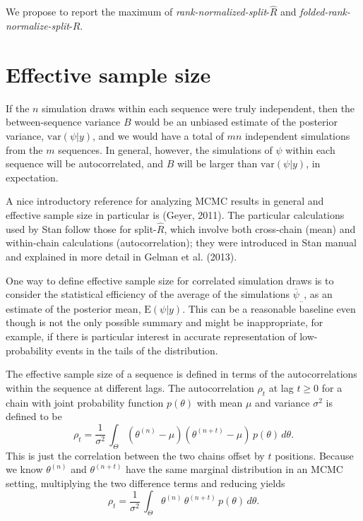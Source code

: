 \documentclass[11pt]{article}
\begin{document}
We propose to report the maximum of {\em
  rank-normalized-split}-$\widehat{R}$ and {\em
  folded-rank-normalize-split}-$\widehat{R}$.

\section{Effective sample size}
If the $n$ simulation draws within each sequence were truly
independent, then the between-sequence variance $B$ would be an unbiased
estimate of the posterior variance, $\mbox{var}(\psi|y)$, and we would have
a total of $mn$ independent simulations from the $m$
sequences.  In general, however, the simulations of $\psi$ within each
sequence will be autocorrelated, and $B$ will be larger than $\mbox{var}(\psi|y)$,
in expectation.

A nice introductory reference for analyzing MCMC results in general
and effective sample size in particular is (Geyer, 2011).  The
particular calculations used by Stan follow those for split-$\hat{R}$,
which involve both cross-chain (mean) and within-chain calculations
(autocorrelation); they were introduced in Stan manual and explained
in more detail in Gelman et al. (2013).

One way to define effective sample size for correlated simulation
draws is to consider the statistical efficiency of the average of the
simulations $\bar{\psi}_{..}$, as an estimate of the posterior mean,
$\mbox{E}(\psi|y)$.  This can be a reasonable baseline even though is
not the only possible summary and might be inappropriate, for example,
if there is particular interest in accurate representation of
low-probability events in the tails of the distribution.

The effective sample size of a sequence is defined in terms of the
autocorrelations within the sequence at different lags.  The
autocorrelation $\rho_t$ at lag $t \geq 0$ for a chain with joint
probability function $p(\theta)$ with mean $\mu$ and variance
$\sigma^2$ is defined to be
\begin{equation}
\rho_t
=
\frac{1}{\sigma^2} \, \int_{\Theta} (\theta^{(n)} - \mu)
(\theta^{(n+t)} - \mu) \, p(\theta) \, d\theta.
\end{equation}
This is just the correlation between the two chains offset by $t$
positions.  Because we know $\theta^{(n)}$ and $\theta^{(n+t)}$ have
the same marginal distribution in an MCMC setting, multiplying the
two difference terms and reducing yields
\begin{equation}
\rho_t
=
\frac{1}{\sigma^2} \, \int_{\Theta} \theta^{(n)} \, \theta^{(n+t)} \, p(\theta) \, d\theta.
\end{equation}
\end{document}
